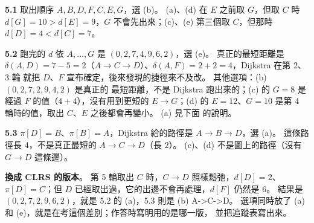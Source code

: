 \begin{pastsoln}
\textbf{5.1} 取出順序 $A, B, D, F, C, E, G$，選 (b)。 (a)、(d) 在 $E$ 之前取 $G$，但取 $C$ 時
$d[G] = 10 > d[E] = 9$，$G$ 不會先出來；(c)、(e) 第三個取 $C$，但那時 $d[D] = 4 < d[C] = 7$。

\textbf{5.2} 跑完的 $d$ 依 $A, \ldots, G$ 是 $(0, 2, 7, 4, 9, 6, 2)$，選 (e)。 真正的最短距離是
$\delta(A, D) = 7 - 5 = 2$（$A \to C \to D$）、$\delta(A, F) = 2 + 2 = 4$，Dijkstra 在第 2、3 輪
就把 $D$、$F$ 宣布確定，後來發現的捷徑來不及改。 其他選項：(b) $(0, 2, 7, 2, 9, 4, 2)$ 是真正的
最短距離，不是 Dijkstra 跑出來的；(c) 的 $G = 8$ 是經過 $F$ 的值（$4 + 4$），沒有用到更短的
$E \to G$；(d) 的 $E = 12$、$G = 10$ 是第 4 輪時的值，取出 $C$、$E$ 之後都會再變小。 (a) 見下面
的說明。

\textbf{5.3} $\pi[D] = B$、$\pi[B] = A$，Dijkstra 給的路徑是 $A \to B \to D$，選 (a)。 這條路徑長
$4$，不是真正最短的 $A \to C \to D$（長 $2$）。 (c)、(d) 不是圖上的路徑（沒有 $G \to D$ 這條邊）。

\textbf{換成 CLRS 的版本}。 第 5 輪取出 $C$ 時，$C \to D$ 照樣鬆弛，$d[D] = 2$、$\pi[D] = C$；但 $D$
已經取出過，它的出邊不會再處理，$d[F]$ 仍然是 $6$。 結果是 $(0, 2, 7, 2, 9, 6, 2)$，就是 5.2 的
(a)，5.3 則是 (b) A->C->D。 選項同時放了 (a) 和 (e)，就是在考這個差別；作答時寫明用的是哪一版，
並把追蹤表寫出來。
\end{pastsoln}
